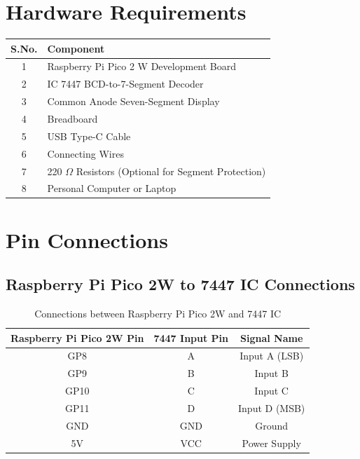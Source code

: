 \documentclass[12pt,a4paper]{article}
\begin{document}
\section{Hardware Requirements}

\renewcommand{\arraystretch}{1.3}

\begin{center}
\begin{tabular}{|c|p{9cm}|}
\hline
\textbf{S.No.} & \textbf{Component} \\
\hline
1 & Raspberry Pi Pico 2 W Development Board \\
\hline
2 & IC 7447 BCD-to-7-Segment Decoder \\
\hline
3 & Common Anode Seven-Segment Display \\
\hline
4 & Breadboard \\
\hline
5 & USB Type-C Cable \\
\hline
6 & Connecting Wires \\
\hline
7 & 220 $\Omega$ Resistors (Optional for Segment Protection) \\
\hline
8 & Personal Computer or Laptop \\
\hline
\end{tabular}
\end{center}
\section{Pin Connections}

\subsection{Raspberry Pi Pico 2W to 7447 IC Connections}

\begin{table}[h!]
\centering
\renewcommand{\arraystretch}{1.3}
\begin{tabular}{|c|c|c|}
\hline
\textbf{Raspberry Pi Pico 2W Pin} & \textbf{7447 Input Pin} & \textbf{Signal Name} \\
\hline
GP8  & A & Input A (LSB) \\
\hline
GP9  & B & Input B \\
\hline
GP10 & C & Input C \\
\hline
GP11 & D & Input D (MSB) \\
\hline
GND  & GND & Ground \\
\hline
5V   & VCC & Power Supply \\
\hline
\end{tabular}
\caption{Connections between Raspberry Pi Pico 2W and 7447 IC}
\end{table}
\end{document}
